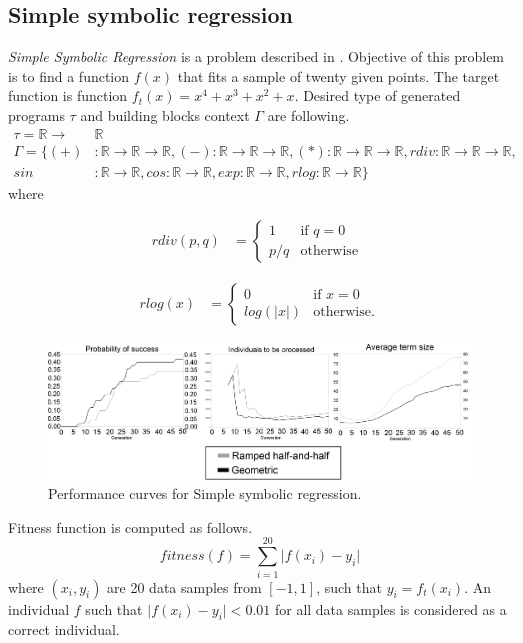 \documentclass{llncs}
\newcommand{\ar}{\rightarrow\xspace}
\newcommand{\Real}{\mathbb{R}}
\begin{document}
\subsection{Simple symbolic regression}
\textit{Simple Symbolic Regression} is a problem described
in \cite{koza92}. Objective of this problem is to 
find a function $f(x)$ that fits a sample
of twenty given points. The target function is 
function $f_{t}(x) = x^4 + x^3 + x^2 + x$.  
Desired type of generated programs $\tau$ and 
building blocks context $\Gamma$ are following.
\begin{align*}
\tau = \Real \ar &\Real\\
\Gamma = \{
  (+)  &: \Real \ar \Real \ar \Real    ,
  (-)   : \Real \ar \Real \ar \Real    ,
  (*)   : \Real \ar \Real \ar \Real    ,
  rdiv  : \Real \ar \Real \ar \Real    ,\\
  sin  &: \Real \ar \Real              ,
  cos   : \Real \ar \Real              ,
  exp   : \Real \ar \Real              , 
  rlog  : \Real \ar \Real              \}
\end{align*}
where
\noindent
\begin{minipage}{.5\linewidth}
\begin{align*}
rdiv(p,q) &= \begin{cases} 1 &\mbox{if } q = 0 \\
p/q & \mbox{otherwise } \end{cases}  
\end{align*}
\end{minipage}%
\begin{minipage}{.5\linewidth}
\begin{align*}
rlog(x) &= \begin{cases} 0 &\mbox{if } x = 0 \\
log(\vert x\vert) & \mbox{otherwise}. \end{cases}
\end{align*}
\end{minipage}

\begin{figure}[h!]
  \caption{Performance curves for Simple symbolic regression.}
  \centering
    \includegraphics[scale=0.135]{imgs/SSR_FINAL.png}
\end{figure}
Fitness function is computed as follows.
$$ fitness(f) =  \sum\limits_{i=1}^{20}{ \vert f(x_i)-y_i }\vert   $$
where $(x_i,y_i)$ are 20 data samples from $[-1,1]$, such that $y_i = f_t(x_i)$.
An individual $f$ such that $\vert f(x_i)-y_i \vert < 0.01 $ for all data samples is 
considered as a correct individual.
\end{document}
